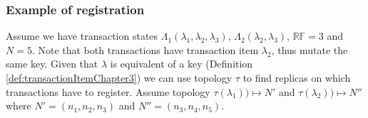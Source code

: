 \documentclass[runningheads,a4paper]{llncs}
\newcommand{\topology}{$\tau$\xspace}
\newcommand{\topologyItem}[2]{$\tau(\text{\txItemi{#1}})) \mapsto \mathit{#2}$}
\newcommand{\paxosRoundIdi}[1]{$\iota_{#1}$\xspace}
\newcommand{\txItem}{$\lambda$\xspace}
\newcommand{\txItemi}[1]{$\lambda_{#1}$\xspace}
\newcommand{\txStatei}[1]{$\Lambda_{#1}$\xspace}
\newcommand{\txIndex}{$\chi$\xspace}
\newcommand{\paxos}{\emph{Paxos}\xspace}
\newcommand{\RF}[1]{\emph{$\mathbb{RF}=#1$}\xspace}
\begin{document}


\subsubsection{Example of registration}
Assume we have transaction states
\txStatei{1}$(\text{\txItemi{1}},\text{\txItemi{2}}, \text{\txItemi{3}})$,
\txStatei{2}$(\text{\txItemi{2}},\text{\txItemi{3}})$, \RF{3} and $N=5$. Note that both transactions have transaction item \txItemi{2}, thus mutate the same key. Given that \txItem is equivalent of a key (Definition \ref{def:transactionItemChapter3}) we can use topology \topology to find replicas on which transactions have to register. Assume topology \topologyItem{1}{N'} and \topologyItem{2}{N''} where $N'=(n_1, n_2, n_3)$ and $N''=(n_3,n_4,n_5)$.
\end{document}
